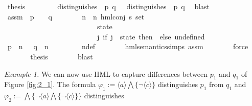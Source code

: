 \begin{isabellebody}
\ {\isacharquery}{\kern0pt}thesis\isanewline
\ \ \isamarkupfalse%
\isanewline
\ \ \ \ \isamarkupfalse%
\ {\isachardoublequoteopen}distinguishes\ {\isasymphi}\ p\ q\ {\isasymLongrightarrow}\ {\isasymexists}{\isasymphi}{\isachardot}{\kern0pt}\ distinguishes\ {\isasymphi}\ p\ q{\isachardoublequoteclose}\ \isamarkupfalse%
\ blast\isanewline
\ \ \isamarkupfalse%
\isanewline
\ \ \ \ \isamarkupfalse%
\ assm{\isacharcolon}{\kern0pt}\ {\isachardoublequoteopen}{\isasymnot}\ p\ {\isasymTurnstile}\ {\isasymphi}\ {\isasymand}\ q\ {\isasymTurnstile}\ {\isasymphi}{\isachardoublequoteclose}\isanewline
\ \ \ \ \isamarkupfalse%
\ n{\isasymphi}\ \ {\isachardoublequoteopen}n{\isasymphi}\ {\isasymequiv}{\isacharparenleft}{\kern0pt}hml{\isacharunderscore}{\kern0pt}conj\ {\isacharparenleft}{\kern0pt}{\isacharbraceleft}{\kern0pt}{\isacharbraceright}{\kern0pt}{\isacharcolon}{\kern0pt}{\isacharcolon}{\kern0pt}{\isacharprime}{\kern0pt}s\ set{\isacharparenright}{\kern0pt}\ \isanewline
\ \ \ \ \ \ \ \ \ \ \ \ \ \ \ \ \ \ \ \ \ \ \ \ \ \ {\isacharbraceleft}{\kern0pt}state{\isacharbraceright}{\kern0pt}\ \isanewline
\ \ \ \ \ \ \ \ \ \ \ \ \ \ \ \ \ \ \ \ \ \ \ \ \ \ {\isacharparenleft}{\kern0pt}{\isasymlambda}j{\isachardot}{\kern0pt}\ if\ j\ {\isacharequal}{\kern0pt}\ state\ then\ {\isasymphi}\ else\ undefined{\isacharparenright}{\kern0pt}{\isacharparenright}{\kern0pt}{\isachardoublequoteclose}\isanewline
\ \ \ \ \isamarkupfalse%
\ {\isachardoublequoteopen}p\ {\isasymTurnstile}\ n{\isasymphi}\ {\isasymand}\ {\isasymnot}\ q\ {\isasymTurnstile}\ n{\isasymphi}{\isachardoublequoteclose}\ \isanewline
\ \ \ \ \ \ \isamarkupfalse%
\ n{\isasymphi}{\isacharunderscore}{\kern0pt}def\isanewline
\ \ \ \ \ \ \isamarkupfalse%
\ hml{\isacharunderscore}{\kern0pt}semantics{\isachardot}{\kern0pt}simps\ assm\isanewline
\ \ \ \ \ \ \isamarkupfalse%
\ force\isanewline
\ \ \ \ \isamarkupfalse%
\ \isamarkupfalse%
\ {\isacharquery}{\kern0pt}thesis\isanewline
\ \ \ \ \ \ \isamarkupfalse%
\ blast\isanewline
\ \ \isamarkupfalse%
\isanewline
{}\isamarkupfalse%
%
\endisatagproof
{\isafoldproof}%
%
\isadelimproof
%
\endisadelimproof
%
\begin{isamarkuptext}%
\textit{Example 1.} We can now use HML to capture differences between $p_1$ and $q_1$ of Figure \ref{fig:2_1}. The formula
$\varphi_1 :=\langle a \rangle\bigwedge\{\lnot\langle c \rangle\}$ distinguishes $p_1$ from $q_1$ and $\varphi_2 := \bigwedge\{\lnot\langle a \rangle\bigwedge\{\lnot\langle c \rangle\}\}$ distinguishes

\end{isamarkuptext}
\end{isabellebody}
